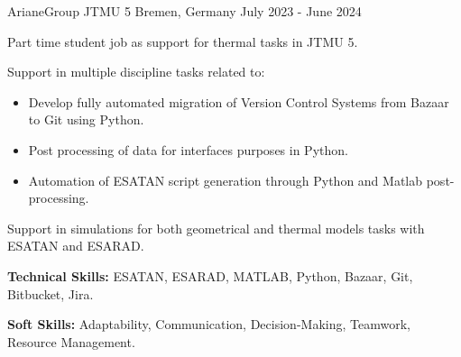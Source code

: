 

\begin{cventries}
  {ArianeGroup JTMU 5}
  {Bremen, Germany}
  {July 2023 - June 2024}
  {
    \begin{cvitems}
      \item Part time student job as support for thermal tasks in JTMU
      5.
      \item Support in multiple discipline tasks related to:
      \begin{itemize}
        \item[\checkmark] Develop fully automated migration of Version
        Control Systems from Bazaar to Git using Python.
        \item[\checkmark] Post processing of data for interfaces
        purposes in Python.
        \item[\checkmark] Automation of ESATAN script generation
        through Python and Matlab post-processing.
      \end{itemize}
      \item Support in simulations for both geometrical and thermal
      models tasks with ESATAN and ESARAD.
      \item \textbf{Technical Skills:} ESATAN, ESARAD, MATLAB, Python,
      Bazaar, Git, Bitbucket, Jira.
      \item \textbf{Soft Skills:} Adaptability, Communication,
      Decision-Making, Teamwork, Resource Management.
    \end{cvitems}
  }


\end{cventries}
